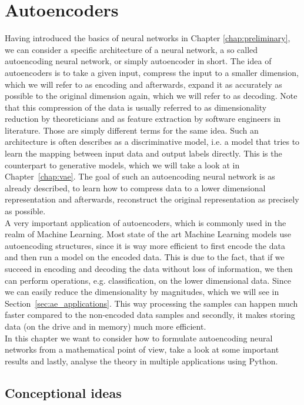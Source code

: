 \chapter{Autoencoders}\label{chap:ae}

Having introduced the basics of neural networks in Chapter \ref{chap:preliminary}, we can consider a specific architecture of a neural network, a so called autoencoding neural network, or simply autoencoder in short. The idea of autoencoders is to take a given input, compress the input to a smaller dimension, which we will refer to as encoding and afterwards, expand it as accurately as possible to the original dimension again, which we will refer to as decoding. Note that this compression of the data is usually referred to as dimensionality reduction by theoreticians and as feature extraction by software engineers in literature. Those are simply different terms for the same idea. Such an architecture is often describes as a discriminative model, i.e. a model that tries to learn the mapping between input data and output labels directly. This is the counterpart to generative models, which we will take a look at in Chapter~\ref{chap:vae}. The goal of such an autoencoding neural network is as already described, to learn how to compress data to a lower dimensional representation and afterwards, reconstruct the original representation as precisely as possible.\\
A very important application of autoencoders, which is commonly used in the realm of Machine Learning. Most state of the art Machine Learning models use autoencoding structures, since it is way more efficient to first encode the data and then run a model on the encoded data.  This is due to the fact, that if we succeed in encoding and decoding the data without loss of information, we then can perform operations, e.g. classification, on the lower dimensional data. Since we can easily reduce the dimensionality by magnitudes, which we will see in Section~\ref{sec:ae_applications}. This way processing the samples can happen much faster compared to the non-encoded data samples and secondly, it makes storing data (on the drive and in memory) much more efficient.\\
In this chapter we want to consider how to formulate autoencoding neural networks from a mathematical point of view, take a look at some important results and lastly, analyse the theory in multiple applications using Python.

\section{Conceptional ideas}

